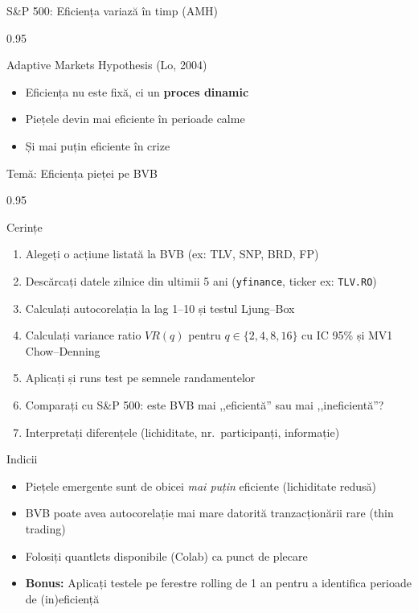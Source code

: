 \documentclass[9pt, aspectratio=169, t]{beamer}
\begin{document}
\begin{frame}[shrink=15]{S\&P 500: Eficiența variază în timp (AMH)}
\begin{cminipage}{0.95\textwidth}
\vspace{0.2cm}
\begin{alertblock}{Adaptive Markets Hypothesis (Lo, 2004)}
\small
\begin{itemize}\setlength{\itemsep}{0pt}
    \item Eficiența nu este fixă, ci un \textbf{proces dinamic}
    \item Piețele devin mai eficiente în perioade calme
    \item Și mai puțin eficiente în crize
\end{itemize}
\end{alertblock}
\end{cminipage}
\end{frame}

\begin{frame}[shrink=15]{Temă: Eficiența pieței pe BVB}
\begin{cminipage}{0.95\textwidth}
\begin{block}{Cerințe}
\begin{enumerate}\setlength{\itemsep}{0pt}
    \item Alegeți o acțiune listată la BVB (ex: TLV, SNP, BRD, FP)
    \item Descărcați datele zilnice din ultimii 5 ani (\texttt{yfinance}, ticker ex: \texttt{TLV.RO})
    \item Calculați autocorelația la lag 1--10 și testul Ljung--Box
    \item Calculați variance ratio $VR(q)$ pentru $q \in \{2, 4, 8, 16\}$ cu IC 95\% și MV1 Chow--Denning
    \item Aplicați și runs test pe semnele randamentelor
    \item Comparați cu S\&P 500: este BVB mai ,,eficientă'' sau mai ,,ineficientă''?
    \item Interpretați diferențele (lichiditate, nr.\ participanți, informație)
\end{enumerate}
\end{block}

\vspace{0.1cm}
\begin{exampleblock}{Indicii}
\begin{itemize}\setlength{\itemsep}{0pt}
    \item Piețele emergente sunt de obicei \textit{mai puțin} eficiente (lichiditate redusă)
    \item BVB poate avea autocorelație mai mare datorită tranzacționării rare (thin trading)
    \item Folosiți quantlets disponibile (Colab) ca punct de plecare
    \item \textbf{Bonus:} Aplicați testele pe ferestre rolling de 1 an pentru a identifica perioade de (in)eficiență
\end{itemize}
\end{exampleblock}
\end{cminipage}
\end{frame}
\end{document}
